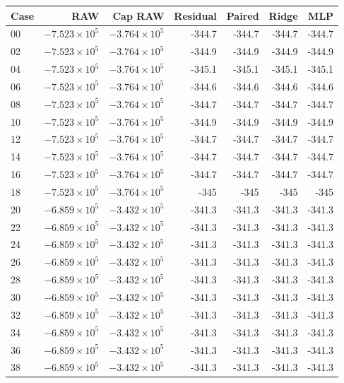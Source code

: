 \begin{tabular}{lrrrrrr}
\toprule
Case & RAW & Cap RAW & Residual & Paired & Ridge & MLP \\
\midrule
00 & \(-7.523\times10^{5}\) & \(-3.764\times10^{5}\) & -344.7 & -344.7 & -344.7 & -344.7 \\
02 & \(-7.523\times10^{5}\) & \(-3.764\times10^{5}\) & -344.9 & -344.9 & -344.9 & -344.9 \\
04 & \(-7.523\times10^{5}\) & \(-3.764\times10^{5}\) & -345.1 & -345.1 & -345.1 & -345.1 \\
06 & \(-7.523\times10^{5}\) & \(-3.764\times10^{5}\) & -344.6 & -344.6 & -344.6 & -344.6 \\
08 & \(-7.523\times10^{5}\) & \(-3.764\times10^{5}\) & -344.7 & -344.7 & -344.7 & -344.7 \\
10 & \(-7.523\times10^{5}\) & \(-3.764\times10^{5}\) & -344.9 & -344.9 & -344.9 & -344.9 \\
12 & \(-7.523\times10^{5}\) & \(-3.764\times10^{5}\) & -344.7 & -344.7 & -344.7 & -344.7 \\
14 & \(-7.523\times10^{5}\) & \(-3.764\times10^{5}\) & -344.7 & -344.7 & -344.7 & -344.7 \\
16 & \(-7.523\times10^{5}\) & \(-3.764\times10^{5}\) & -344.7 & -344.7 & -344.7 & -344.7 \\
18 & \(-7.523\times10^{5}\) & \(-3.764\times10^{5}\) & -345 & -345 & -345 & -345 \\
20 & \(-6.859\times10^{5}\) & \(-3.432\times10^{5}\) & -341.3 & -341.3 & -341.3 & -341.3 \\
22 & \(-6.859\times10^{5}\) & \(-3.432\times10^{5}\) & -341.3 & -341.3 & -341.3 & -341.3 \\
24 & \(-6.859\times10^{5}\) & \(-3.432\times10^{5}\) & -341.3 & -341.3 & -341.3 & -341.3 \\
26 & \(-6.859\times10^{5}\) & \(-3.432\times10^{5}\) & -341.3 & -341.3 & -341.3 & -341.3 \\
28 & \(-6.859\times10^{5}\) & \(-3.432\times10^{5}\) & -341.3 & -341.3 & -341.3 & -341.3 \\
30 & \(-6.859\times10^{5}\) & \(-3.432\times10^{5}\) & -341.3 & -341.3 & -341.3 & -341.3 \\
32 & \(-6.859\times10^{5}\) & \(-3.432\times10^{5}\) & -341.3 & -341.3 & -341.3 & -341.3 \\
34 & \(-6.859\times10^{5}\) & \(-3.432\times10^{5}\) & -341.3 & -341.3 & -341.3 & -341.3 \\
36 & \(-6.859\times10^{5}\) & \(-3.432\times10^{5}\) & -341.3 & -341.3 & -341.3 & -341.3 \\
38 & \(-6.859\times10^{5}\) & \(-3.432\times10^{5}\) & -341.3 & -341.3 & -341.3 & -341.3 \\
\bottomrule
\end{tabular}
